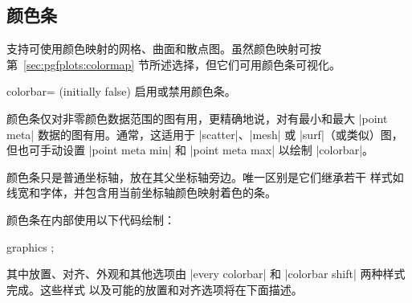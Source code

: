 \subsection{颜色条}
\label{pgfplots:colorbar}

\PGFPlots{} 支持可使用颜色映射的网格、曲面和散点图。虽然颜色映射可按
第~\ref{sec:pgfplots:colormap} 节所述选择，但它们可用颜色条可视化。

\begin{pgfplotskey}{colorbar= (initially false)}
    启用或禁用颜色条。
\begin{codeexample}[]
\end{codeexample}

\begin{codeexample}[]
\end{codeexample}

\begin{codeexample}[]
\end{codeexample}

    颜色条仅对非零颜色数据范围的图有用，更精确地说，对有最小和最大
    |point meta| 数据的图有用。通常，这适用于 |scatter|、|mesh| 或
    |surf|（或类似）图，但也可手动设置 |point meta min| 和
    |point meta max| 以绘制 |colorbar|。

    颜色条只是普通坐标轴，放在其父坐标轴旁边。唯一区别是它们继承若干
    样式如线宽和字体，并包含用当前坐标轴颜色映射着色的条。

    颜色条在内部使用以下代码绘制：
\begin{codeexample}
\axis [
    every colorbar,
    colorbar shift,
    colorbar=false,
]
    \addplot graphics {};
\endaxis
\end{codeexample}
    \noindent 其中放置、对齐、外观和其他选项由
    |every colorbar| 和 |colorbar shift| 两种样式完成。这些样式
    以及可能的放置和对齐选项将在下面描述。



\end{pgfplotskey}
